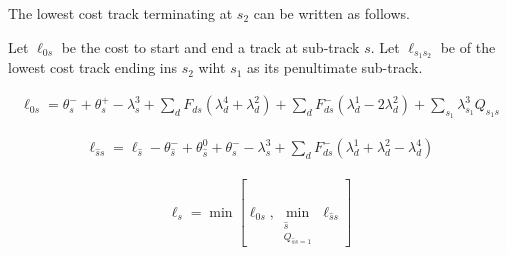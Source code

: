 \documentclass{article}
\begin{document}
The lowest cost track terminating at $s_2$ can be written as follows.  

Let $\ell_{0s}$ be the cost to start and end a track at sub-track $s$.  Let $\ell_{s_1s_2}$ be of the lowest cost track ending ins $s_2$ wiht $s_1$ as its penultimate sub-track.  

\begin{align}
\ell_{0s}=\theta^-_s+\theta^+_s-\lambda^3_s+\sum_{d}F_{ds}(\lambda^4_d+\lambda^2_d)+\sum_{d}F^-_{ds}(\lambda^1_d-2\lambda^2_d)+ \sum_{s_1} \lambda^3_{s_1}Q_{s_1s}
\end{align}

\begin{align}
\ell_{\hat{s}s}=\ell_{\hat{s}}-\theta^-_{\hat{s}}+\theta^0_{\hat{s}}+\theta^-_s-\lambda^3_s+\sum_{d}F^-_{ds}(\lambda^1_d+\lambda^2_d-\lambda^4_d) %
\end{align}

\begin{align}
\ell_s=\min [\ell_{0s},\min_{\substack{\hat{s} \\ Q_{\hat{s}s=1}}}\ell_{\hat{s}s}]
\end{align}


\end{document}
